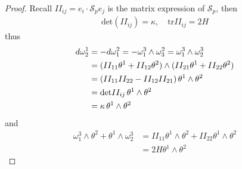 \documentclass[10pt]{article}
\begin{document}
            \begin{proof}
                Recall $II_{ij} = e_i\cdot\mathcal{S}_pe_j$ is the matrix expression of $\mathcal{S}_p$, then
                \begin{equation*}
                    \begin{aligned}
                        \text{det}(II_{ij}) = \kappa, \quad\text{tr}II_{ij} = 2H
                    \end{aligned}
                \end{equation*}
                thus
                \begin{equation*}
                    \begin{aligned}
                        d\omega_2^1 &= -d\omega_1^2 = -\omega_1^3\wedge\omega_3^2 = \omega_1^3\wedge\omega_2^3 \\
                        &= (II_{11}\theta^1 + II_{12}\theta^2) \wedge (II_{21}\theta^1 + II_{22}\theta^2) \\
                        &= (II_{11}II_{22} - II_{12}II_{21})\thinspace\theta^1\wedge\theta^2 \\
                        &= \text{det}II_{ij}\thinspace\theta^1\wedge\theta^2 \\ 
                        &= \kappa\thinspace\theta^1\wedge\theta^2 \\
                    \end{aligned}
                \end{equation*}
                and
                \begin{equation*}
                    \begin{aligned}
                        \omega_1^3\wedge\theta^2 + \theta^1\wedge\omega_2^3 &= II_{11}\theta^1\wedge\theta^2 + II_{22}\theta^1\wedge\theta^2 \\ 
                        &= 2H\theta^1\wedge\theta^2
                    \end{aligned}
                \end{equation*}
            \end{proof}
\end{document}

